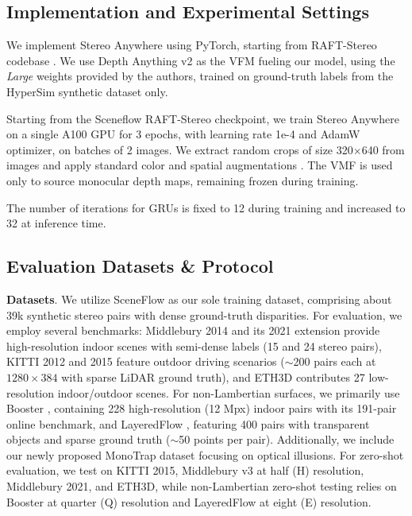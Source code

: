 \documentclass[10pt,twocolumn,letterpaper]{article}
\newcommand{\method}[0]{Stereo Anywhere\xspace}
\begin{document}
\subsection{Implementation and Experimental Settings}

We implement \method using PyTorch, starting from RAFT-Stereo codebase \cite{lipson2021raft}.
We use Depth Anything v2 \cite{depth_anything_v2} as the VFM fueling our model, using the \textit{Large} weights provided by the authors, trained on ground-truth labels from the HyperSim synthetic dataset \cite{roberts2021} only.

Starting from the Sceneflow RAFT-Stereo checkpoint, we train \method on a single A100 GPU for 3 epochs, with learning rate 1e-4 and AdamW optimizer, on batches of 2 images. We extract random crops of size 320$\times$640 from images and apply standard color and spatial augmentations \cite{lipson2021raft}.
The VMF is used only to source monocular depth maps, remaining frozen during training.

The number of iterations for GRUs is fixed to 12 during training and increased to 32 at inference time.

\subsection{Evaluation Datasets \& Protocol}

\textbf{Datasets}. We utilize SceneFlow \cite{mayer2016large} as our sole training dataset, comprising about 39k synthetic stereo pairs with dense ground-truth disparities. For evaluation, we employ several benchmarks: Middlebury 2014 \cite{scharstein2014high} and its 2021 extension \cite{middlebury2021} provide high-resolution indoor scenes with semi-dense labels (15 and 24 stereo pairs), KITTI 2012 \cite{geiger2012we} and 2015 \cite{menze2015object} feature outdoor driving scenarios ($\sim$200 pairs each at $1280 \times 384$ with sparse LiDAR ground truth), and ETH3D \cite{schops2017multi} contributes 27 low-resolution indoor/outdoor scenes. For non-Lambertian surfaces, we primarily use Booster \cite{zamaramirez2022booster}, containing 228 high-resolution (12 Mpx) indoor pairs with its 191-pair online benchmark, and LayeredFlow \cite{wen2024layeredflow}, featuring 400 pairs with transparent objects and sparse ground truth ($\sim$50 points per pair). Additionally, we include our newly proposed MonoTrap dataset focusing on optical illusions. For zero-shot evaluation, we test on KITTI 2015, Middlebury v3 at half (H) resolution, Middlebury 2021, and ETH3D, while non-Lambertian zero-shot testing relies on Booster at quarter (Q) resolution and LayeredFlow at eight (E) resolution.
\end{document}
